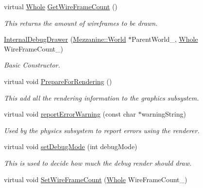 \begin{DoxyCompactItemize}
virtual \hyperlink{namespaceMezzanine_adcbb6ce6d1eb4379d109e51171e2e493}{Whole} \hyperlink{classMezzanine_1_1debug_1_1InternalDebugDrawer_a2d747dbcc3fb7d0c18fc21c8df2c57ef}{GetWireFrameCount} ()
\begin{DoxyCompactList}\small\item\em This returns the amount of wireframes to be drawn. \item\end{DoxyCompactList}\item 
\hyperlink{classMezzanine_1_1debug_1_1InternalDebugDrawer_afba37710a312f272859fecbe01b9f643}{InternalDebugDrawer} (\hyperlink{classMezzanine_1_1World}{Mezzanine::World} $\ast$ParentWorld\_\-, \hyperlink{namespaceMezzanine_adcbb6ce6d1eb4379d109e51171e2e493}{Whole} WireFrameCount\_)
\begin{DoxyCompactList}\small\item\em Basic Constructor. \item\end{DoxyCompactList}\item 
virtual void \hyperlink{classMezzanine_1_1debug_1_1InternalDebugDrawer_a4600feca2ea7570300e80b4daa49a41b}{PrepareForRendering} ()
\begin{DoxyCompactList}\small\item\em This add all the rendering information to the graphics subsystem. \item\end{DoxyCompactList}\item 
virtual void \hyperlink{classMezzanine_1_1debug_1_1InternalDebugDrawer_a263870f8b8e6099d3bd200ccc283ff25}{reportErrorWarning} (const char $\ast$warningString)
\begin{DoxyCompactList}\small\item\em Used by the physics subsystem to report errors using the renderer. \item\end{DoxyCompactList}\item 
virtual void \hyperlink{classMezzanine_1_1debug_1_1InternalDebugDrawer_a3a678f0ac120893bd32351a138211cc4}{setDebugMode} (int debugMode)
\begin{DoxyCompactList}\small\item\em This is used to decide how much the debug render should draw. \item\end{DoxyCompactList}\item 
virtual void \hyperlink{classMezzanine_1_1debug_1_1InternalDebugDrawer_a90fdd352bf1b49a62653a9aa4878f49a}{SetWireFrameCount} (\hyperlink{namespaceMezzanine_adcbb6ce6d1eb4379d109e51171e2e493}{Whole} WireFrameCount\_\-)

\end{DoxyCompactItemize}
